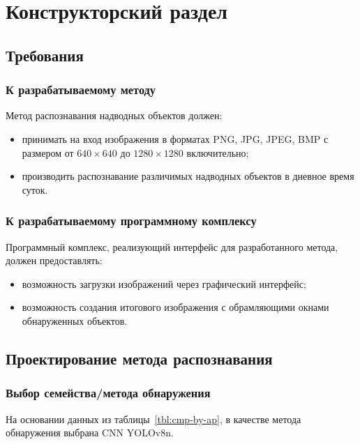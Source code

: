 \chapter{Конструкторский раздел}

\section{Требования}

\subsection*{К разрабатываемому методу}

Метод распознавания надводных объектов должен:
\begin{itemize}[label=---]
    \item принимать на вход изображения в форматах PNG, JPG, JPEG, BMP с размером от $640 \times 640$ до $1280 \times 1280$ включительно;
    \item производить распознавание различимых надводных объектов в дневное время суток.
\end{itemize}

\subsection*{К разрабатываемому программному комплексу}

Программный комплекс, реализующий интерфейс для разработанного метода, должен предоставлять:
\begin{itemize}[label=---]
    \item возможность загрузки изображений через графический интерфейс;
    \item возможность создания итогового изображения с обрамляющими окнами обнаруженных объектов.
\end{itemize}

\section{Проектирование метода распознавания}

\subsection{Выбор семейства/метода обнаружения}

На основании данных из таблицы~\ref{tbl:cmp-by-ap}, в качестве метода обнаружения выбрана CNN YOLOv8n.

